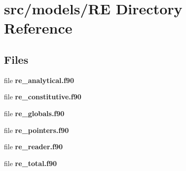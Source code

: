 \section{src/models/\+RE Directory Reference}
\label{dir_0eeb2b73a913e00ab4e329a1e1035fb2}
\subsection*{Files}
\begin{DoxyCompactItemize}
\item 
file {\bf re\+\_\+analytical.\+f90}
\item 
file {\bf re\+\_\+constitutive.\+f90}
\item 
file {\bf re\+\_\+globals.\+f90}
\item 
file {\bf re\+\_\+pointers.\+f90}
\item 
file {\bf re\+\_\+reader.\+f90}
\item 
file {\bf re\+\_\+total.\+f90}
\end{DoxyCompactItemize}
